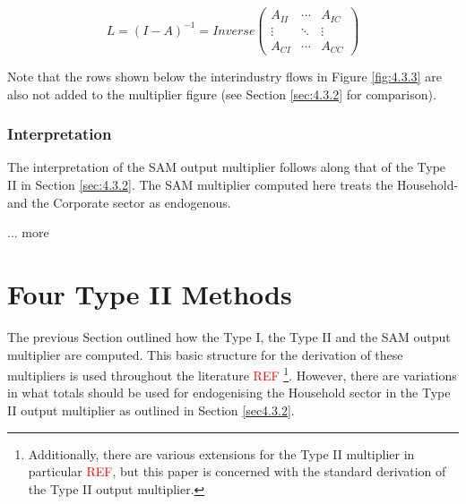 \begin{doublespacing}
  \bigskip \begin{singlespacing}  \begin{equation} \label{eq:4.3.6}
  L=(I-A)^{-1} = Inverse   \begin{pmatrix}
  A_{II} & \cdots & A_{IC}  \\
  \vdots & \ddots & \vdots  \\
  A_{CI} & \cdots & A_{CC}
  \end{pmatrix} \end{equation} \end{singlespacing}  \bigskip

Note that the rows shown below the interindustry flows in Figure \ref{fig:4.3.3} are also not added to the multiplier figure (see Section \ref{sec:4.3.2} for comparison).

\subsubsection{Interpretation}

The interpretation of the SAM output multiplier follows along that of the Type II in Section \ref{sec:4.3.2}. The SAM multiplier computed here treats the Household- and the Corporate sector as endogenous.

\bigskip

... more

\bigskip


\newpage
    \section{Four Type II Methods}
\label{sec:4.4}

The previous Section outlined how the Type I, the Type II and the SAM output multiplier are computed. This basic structure for the derivation of these multipliers is used throughout the literature \textcolor{red}{REF} \footnote{ Additionally, there are various extensions for the Type II multiplier in particular \textcolor{red}{REF}, but this paper is concerned with the standard derivation of the Type II output multiplier.}. However, there are variations in what totals should be used for endogenising the Household sector in the Type II output multiplier as outlined in Section \ref{sec4.3.2}.

\bigskip


\end{doublespacing}
